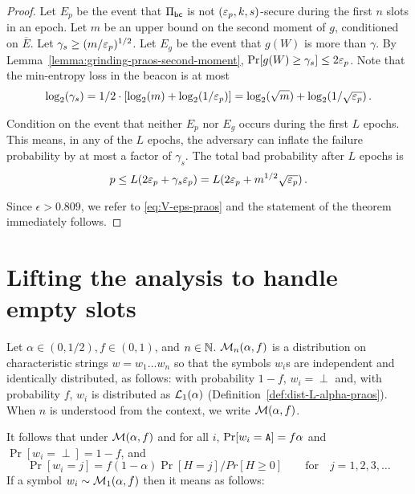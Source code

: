 \begin{proof}
  Let $E_p$ be the event that 
  $\Pi_\mathsf{bc}$ is not $(\mathsf{\varepsilon}_p, k, s)$-secure during 
  the first $n$ slots in an epoch. 
  Let $m$ be an upper bound on the second moment of $g$, 
  conditioned on $\overline{E}$. 
  Let $\gamma_s \geq (m/\mathsf{\varepsilon}_p)^{1/2}$. 
  Let $E_g$ be the event that $g(W)$ is more than $\gamma$.
  By Lemma~\ref{lemma:grinding-praos-second-moment}, 
  $\Pr[g(W) \geq \gamma_s] \leq 2 \mathsf{\varepsilon}_p$. 
  Note that the min-entropy loss in the beacon is at most 
  \begin{equation}\label{eq:log-gamma}
   \log_2(\gamma_s) 
   = 1/2 \cdot [\log_2(m) + \log_2(1/\mathsf{\varepsilon}_p)]
   = \log_2(\sqrt{m}) + \log_2(1/\sqrt{\mathsf{\varepsilon}_p})
   \,. 
  \end{equation}


  Condition on the event that neither $E_p$ nor $E_g$ 
  occurs during the first $L$ epochs. 
  This means, in any of the $L$ epochs, 
  the adversary can inflate the failure probability 
  by at most a factor of $\gamma_s$.
  The total bad probability after $L$ epochs is
  $$
    p
    \leq L (2 \mathsf{\varepsilon}_p + \gamma_s \mathsf{\varepsilon}_p)
    = L (2 \mathsf{\varepsilon}_p + m^{1/2} \sqrt{\mathsf{\varepsilon}_p})
    \,.
  $$

  Since $\epsilon > 0.809$, we refer to \eqref{eq:V-eps-praos} 
  and the statement of the theorem immediately follows.
\end{proof}

%   







\section{Lifting the analysis to handle empty slots}\label{sec:praos-empty-slots}


  \begin{definition}\label{def:dist-M-alpha-f-praos}
    Let $\alpha \in (0,1/2), f \in (0,1)$, and $n \in \mathbb{N}$. 
    $\mathcal{M}_n(\alpha, f)$ is a distribution on characteristic strings 
    $w = w_1 \ldots w_n$ so that 
    the symbols $w_i$s are independent and identically distributed, as follows: 
    with probability $1-f$, $w_i = \perp$ 
    and, with probability $f$, 
    $w_i$ is distributed as $\mathcal{L}_1(\alpha)$ (Definition~\ref{def:dist-L-alpha-praos}).
    When $n$ is understood from the context, 
    we write $\mathcal{M}(\alpha, f)$. 
  \end{definition}
  \noindent
  It follows that under $\mathcal{M}(\alpha, f)$ and for all $i$,
    $\Pr[w_i = \mathtt{A}] = f \alpha$ and $\Pr[w_i = \perp] = 1-f$, and 
    $$
      \Pr[w_i = j] = f (1-\alpha)\Pr[H = j]/Pr[H \geq 0]
        \qquad \text{for}\quad j = 1,2,3,\ldots
    $$
  If a symbol $w_i \sim \mathcal{M}_1(\alpha,f)$ then it means as follows: 

